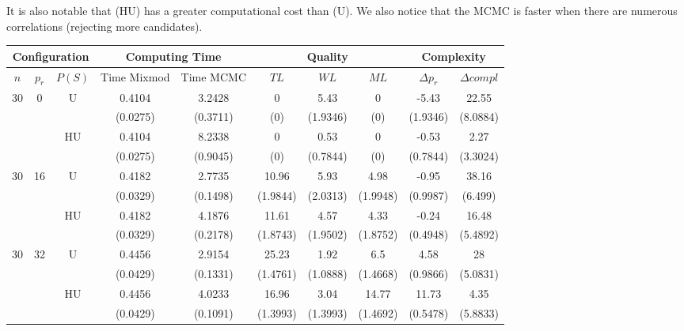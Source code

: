 \documentclass[11pt,a4paper]{article}
\begin{document}
 It is also notable that (HU) has a greater computational cost than (U). 
	We also notice that the MCMC is faster when there are numerous correlations (rejecting more candidates). 
\begin{table}[h!]
\centering
\begin{tabular}{|c|c|c|c|c|c|c|c|c|c|}
\hline
\multicolumn{3}{|c}{Configuration}  &  \multicolumn{2}{|c}{Computing Time}  & \multicolumn{3}{|c}{Quality} & \multicolumn{2}{|c|}{Complexity}\\
\hline
$n$ & $p_r$ & $P(S)$ &  Time Mixmod  & Time MCMC  & $TL$ & $WL$ & $ML$ & $\Delta p_r$ & $\Delta compl$ \\
\hline %
30 & 0 & U&0.4104 & 3.2428 & 0 & 5.43 & 0 & -5.43 & 22.55  \\
& & & (0.0275) & (0.3711) & (0) & (1.9346) & (0) & (1.9346) & (8.0884) \\
 &  &HU &0.4104 & 8.2338 & 0 & 0.53 & 0 & -0.53 & 2.27  \\
& & & (0.0275) & (0.9045) & (0) & (0.7844) & (0) & (0.7844) & (3.3024) \\
\hline %
30 & 16 & U&0.4182 & 2.7735 & 10.96 & 5.93 & 4.98 & -0.95 & 38.16  \\
& & & (0.0329) & (0.1498) & (1.9844) & (2.0313) & (1.9948) & (0.9987) & (6.499) \\
 &  &HU &0.4182 & 4.1876 & 11.61 & 4.57 & 4.33 & -0.24 & 16.48  \\
& & & (0.0329) & (0.2178) & (1.8743) & (1.9502) & (1.8752) & (0.4948) & (5.4892) \\
\hline %
30 & 32 & U & 0.4456 & 2.9154 & 25.23 & 1.92 & 6.5 & 4.58 & 28  \\
& & & (0.0429) & (0.1331) & (1.4761) & (1.0888) & (1.4668) & (0.9866) & (5.0831) \\
 &  & HU & 0.4456 & 4.0233 & 16.96 & 3.04 & 14.77 & 11.73 & 4.35  \\
& & & (0.0429) & (0.1091) & (1.3993) & (1.3993) & (1.4692) & (0.5478) & (5.8833) \\
\hline
\hline %

\end{tabular}
\end{table}
\end{document}
